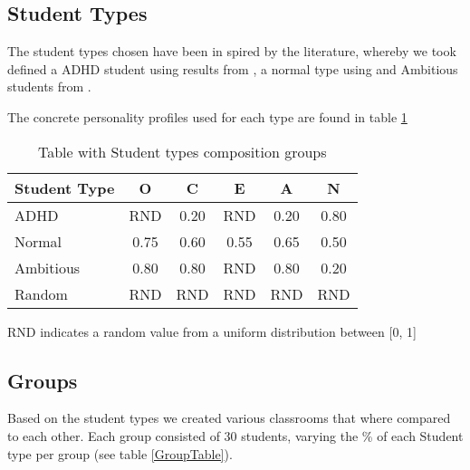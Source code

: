 \subsection{Student Types}
The student types chosen have been in spired by the literature, whereby we 
took defined a ADHD student using results from \cite{Nigg2002}, a normal type using
\cite{Srivastava2003} and Ambitious students from \cite{Asendorpf2003}.

The concrete personality profiles used for each type are found in table \ref{StudenTypesTable}

\begin{table}[h!]
    \centering
    \begin{tabular}{|l|c|c|c|c|c|} 
        \hline
        \textbf{Student Type} & \textbf{O} & \textbf{C} & \textbf{E} & \textbf{A} & \textbf{N} \\
        \hline
        \hline
        ADHD & RND & 0.20 & RND & 0.20 & 0.80 \\
        \hline
        Normal & 0.75 & 0.60 & 0.55 & 0.65 & 0.50 \\
        \hline
        Ambitious & 0.80 & 0.80 & RND & 0.80 & 0.20 \\
        \hline
        Random & RND & RND & RND & RND & RND \\
        \hline
    \end{tabular}
    \caption{Table with Student types composition groups}
    \small RND indicates a random value from a uniform distribution between [0, 1]
    \label{StudenTypesTable}
\end{table}

\subsection{Groups}
Based on the student types we created various classrooms that where compared to
each other. Each group consisted of 30 students, varying the \% of each Student
type per group (see table \ref{GroupTable}).

